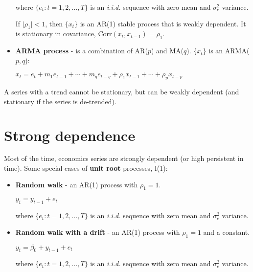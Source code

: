 \documentclass[10pt, a4paper, landscape]{article}
\newcommand{\Corr}{\mathrm{Corr}}
\begin{document}
\begin{multicols}{3}
\begin{itemize}[leftmargin=*]
			where $\lbrace e_{t} : t = 1, 2, \ldots, T \rbrace$ is an \textsl{i.i.d.} sequence with zero mean and $\sigma^{2}_{e}$ variance.
			
			If $\lvert \rho_{1} \rvert < 1$, then $\lbrace x_{t} \rbrace$ is an AR(1) stable process that is weakly dependent. It is stationary in covariance, $\Corr(x_{t}, x_{t - 1}) = \rho_{1}$.
		
		\columnbreak
		
			\item \textbf{ARMA process} - is a combination of AR($p$) and MA($q$). $\lbrace x_{t} \rbrace$ is an ARMA($p, q$):
			
			\begin{center}
				$x_{t} = e_{t} + m_{1} e_{t - 1} + \cdots + m_{q} e_{t - q} + \rho_{1} x_{t - 1} + \cdots + \rho_{p} x_{t - p}$
			\end{center}
		\end{itemize}
		
		A series with a trend cannot be stationary, but can be weakly dependent (and stationary if the series is de-trended).
		
		\section*{Strong dependence}
		
		Most of the time, economics series are strongly dependent (or high persistent in time). Some special cases of \textbf{unit root} processes, I(1):
		
		\begin{itemize}[leftmargin=*]
			\item \textbf{Random walk} - an AR(1) process with $\rho_{1} = 1$.
			
			\begin{center}
				$y_{t} = y_{t - 1} + e_{t}$
			\end{center}
			
			where $\lbrace e_{t} : t = 1, 2, \ldots, T \rbrace$ is an \textsl{i.i.d.} sequence with zero mean and $\sigma^{2}_{e}$ variance.
			
			\item \textbf{Random walk with a drift} - an AR(1) process with $\rho_{1} = 1$ and a constant.
			
			\begin{center}
				$y_{t} = \beta_{0} + y_{t - 1} + e_{t}$
			\end{center}
			
			where $\lbrace e_{t} : t = 1, 2, \ldots, T \rbrace$ is an \textsl{i.i.d.} sequence with zero mean and $\sigma^{2}_{e}$ variance.
		\end{itemize}
		

\end{multicols}
\end{document}
